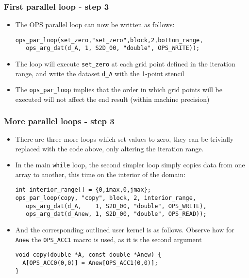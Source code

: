 \documentclass{beamer}
\begin{document}
\begin{frame}[fragile]
\frametitle{First parallel loop - step 3}
\begin{itemize}
\item The OPS parallel loop can now be written as follows:
\begin{lstlisting}
ops_par_loop(set_zero,"set_zero",block,2,bottom_range,
   ops_arg_dat(d_A, 1, S2D_00, "double", OPS_WRITE));
\end{lstlisting}  
  \item The loop will execute \texttt{set\_zero} at each grid point defined in the iteration range, and write the dataset \texttt{d\_A} with the 1-point stencil
  \item The \texttt{ops\_par\_loop} implies that the order in which grid points will be executed will not affect the end result (within machine precision)
\end{itemize}
\end{frame}

\begin{frame}[fragile]
\frametitle{More parallel loops - step 3}
\begin{itemize}
\item There are three more loops which set values to zero, they can be trivially replaced with the code above, only altering the iteration range.
\item In the main \texttt{while} loop, the second simpler loop simply copies data from one array to another, this time on the interior of the domain:
\begin{lstlisting}
int interior_range[] = {0,imax,0,jmax};
ops_par_loop(copy, "copy", block, 2, interior_range,
   ops_arg_dat(d_A,    1, S2D_00, "double", OPS_WRITE),
   ops_arg_dat(d_Anew, 1, S2D_00, "double", OPS_READ));
\end{lstlisting}  
  \item And the corresponding outlined user kernel is as follows. Observe how for \texttt{Anew} the \texttt{OPS\_ACC1} macro is used, as it is the second argument
\begin{lstlisting}
void copy(double *A, const double *Anew) {
  A[OPS_ACC0(0,0)] = Anew[OPS_ACC1(0,0)];
}
\end{lstlisting}  
\end{itemize}
\end{frame}
\end{document}
